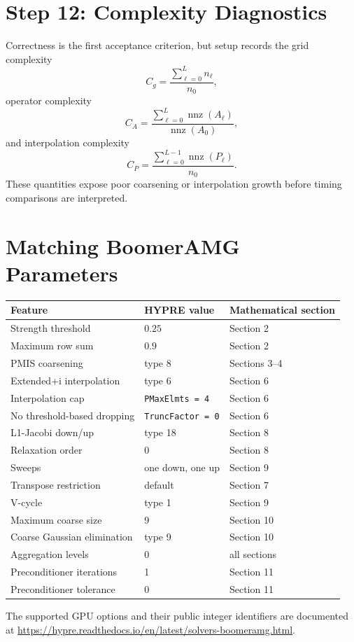 \documentclass[11pt]{article}
\newcommand{\level}{\ell}
\DeclareMathOperator{\nnz}{nnz}
\begin{document}
\section{Step 12: Complexity Diagnostics}

Correctness is the first acceptance criterion, but setup records the grid
complexity
\begin{equation}
  C_g
  =
  \frac{\displaystyle\sum_{\level=0}^{L}n_\level}{n_0},
  \label{eq:grid-complexity}
\end{equation}
operator complexity
\begin{equation}
  C_A
  =
  \frac{\displaystyle\sum_{\level=0}^{L}\nnz(A_\level)}
       {\nnz(A_0)},
  \label{eq:operator-complexity}
\end{equation}
and interpolation complexity
\begin{equation}
  C_P
  =
  \frac{\displaystyle\sum_{\level=0}^{L-1}\nnz(P_\level)}
       {n_0}.
  \label{eq:interpolation-complexity}
\end{equation}
These quantities expose poor coarsening or interpolation growth before timing
comparisons are interpreted.

\appendix

\section{Matching BoomerAMG Parameters}

\begin{center}
\begin{tabular}{@{}lll@{}}
\toprule
Feature & HYPRE value & Mathematical section\\
\midrule
Strength threshold & $0.25$ & Section 2\\
Maximum row sum & $0.9$ & Section 2\\
PMIS coarsening & type 8 & Sections 3--4\\
Extended+i interpolation & type 6 & Section 6\\
Interpolation cap & \texttt{PMaxElmts = 4} & Section 6\\
No threshold-based dropping & \texttt{TruncFactor = 0} & Section 6\\
L1-Jacobi down/up & type 18 & Section 8\\
Relaxation order & 0 & Section 8\\
Sweeps & one down, one up & Section 9\\
Transpose restriction & default & Section 7\\
V-cycle & type 1 & Section 9\\
Maximum coarse size & 9 & Section 10\\
Coarse Gaussian elimination & type 9 & Section 10\\
Aggregation levels & 0 & all sections\\
Preconditioner iterations & 1 & Section 11\\
Preconditioner tolerance & 0 & Section 11\\
\bottomrule
\end{tabular}
\end{center}

The supported GPU options and their public integer identifiers are documented
at
\url{https://hypre.readthedocs.io/en/latest/solvers-boomeramg.html}.
\end{document}
